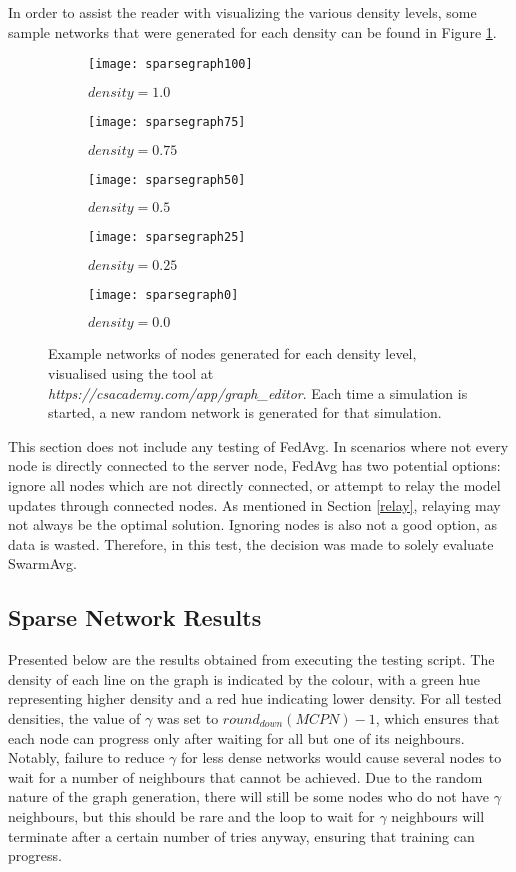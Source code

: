 In order to assist the reader with visualizing the various density levels, some sample networks that were generated for each density can be found in Figure \ref{densefig}.

\begin{figure}[H]
	\centering
	\begin{subfigure}[b]{0.3\textwidth}
		\centering
		\texttt{[image: sparsegraph100]}
		\caption{$density=1.0$}
	\end{subfigure}
	\begin{subfigure}[b]{0.3\textwidth}
		\centering
		\texttt{[image: sparsegraph75]}
		\caption{$density=0.75$}
	\end{subfigure}
	\begin{subfigure}[b]{0.3\textwidth}
		\centering
		\texttt{[image: sparsegraph50]}
		\caption{$density=0.5$}
	\end{subfigure}
	\begin{subfigure}[b]{0.3\textwidth}
		\centering
		\texttt{[image: sparsegraph25]}
		\caption{$density=0.25$}
	\end{subfigure}
	\begin{subfigure}[b]{0.3\textwidth}
		\centering
		\texttt{[image: sparsegraph0]}
		\caption{$density=0.0$}
	\end{subfigure}
	\caption{Example networks of nodes generated for each density level, visualised using the tool at \emph{https://csacademy.com/app/graph\_editor}. Each time a simulation is started, a new random network is generated for that simulation. \label{densefig}}
{}\end{figure}


This section does not include any testing of FedAvg. In scenarios where not every node is directly connected to the server node, FedAvg has two potential options: ignore all nodes which are not directly connected, or attempt to relay the model updates through connected nodes. As mentioned in Section \ref{relay}, relaying may not always be the optimal solution. Ignoring nodes is also not a good option, as data is wasted. Therefore, in this test, the decision was made to solely evaluate SwarmAvg.


\subsection{Sparse Network Results}
Presented below are the results obtained from executing the testing script. The density of each line on the graph is indicated by the colour, with a green hue representing higher density and a red hue indicating lower density. For all tested densities, the value of $\gamma$ was set to $round_{down}(MCPN) - 1$, which ensures that each node can progress only after waiting for all but one of its neighbours. Notably, failure to reduce $\gamma$ for less dense networks would cause several nodes to wait for a number of neighbours that cannot be achieved. Due to the random nature of the graph generation, there will still be some nodes who do not have $\gamma$ neighbours, but this should be rare and the loop to wait for $\gamma$ neighbours will terminate after a certain number of tries anyway, ensuring that training can progress.

